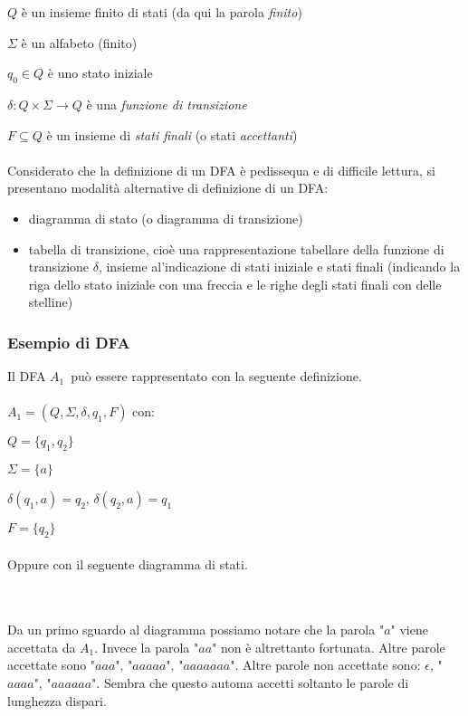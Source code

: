 \documentclass[]{article}
\begin{document}
\mbox{$Q$} è un insieme finito di stati (da qui la parola \textit{finito})

\mbox{$\Sigma$} è un alfabeto (finito)

\mbox{$q_0 \in Q$} è uno stato iniziale

\mbox{$\delta \colon Q \times \Sigma \to Q$} è una \textit{funzione di transizione}

\mbox{$F \subseteq Q$} è un insieme di \textit{stati finali} (o stati \textit{accettanti})
\\
\\
Considerato che la definizione di un DFA è pedissequa e di difficile lettura, si presentano modalità alternative di definizione di un DFA:
\begin{itemize}
    \item diagramma di stato (o diagramma di transizione)
    \item tabella di transizione, cioè una rappresentazione tabellare della funzione di transizione \mbox{$\delta$}, insieme al'indicazione di stati iniziale e stati finali (indicando la riga dello stato iniziale con una freccia e le righe degli stati finali con delle stelline)
\end{itemize}



\newpage
\subsubsection{Esempio di DFA}

Il DFA \mbox{$A_1$}\ può essere rappresentato con la seguente definizione.
\\
\\
\mbox{$A_1 = (Q, \Sigma, \delta, q_1, F)$} con:

\mbox{$Q = \{ q_1, q_2 \}$}

\mbox{$\Sigma = \{ a \}$}

\mbox{$\delta(q_1, a) = q_2$}, \mbox{$\delta(q_2, a) = q_1$}

\mbox{$F = \{ q_2 \}$}
\\
\\
Oppure con il seguente diagramma di stati.
\\
\\
\\
Da un primo sguardo al diagramma possiamo notare che la parola "\mbox{$a$}" viene accettata da \mbox{$A_1$}.
Invece la parola "\mbox{$aa$}" non è altrettanto fortunata. Altre parole accettate sono "\mbox{$aaa$}",
"\mbox{$aaaaa$}", "\mbox{$aaaaaaa$}".
Altre parole non accettate sono: \mbox{$\epsilon$}, "\mbox{$aaaa$}", "\mbox{$aaaaaa$}". Sembra che questo automa
accetti soltanto le parole di lunghezza dispari.
\end{document}
